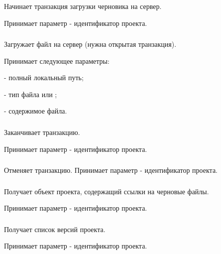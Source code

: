 Начинает транзакция загрузки черновика на сервер.

Принимает параметр  - идентификатор проекта.

\subsubsection{}

Загружает файл на сервер (нужна открытая транзакция). 

Принимает следующее параметры:

\begin{icItems}
	\item {} - полный локальный путь;
	\item {} - тип файла  или ;
	\item {} - содержимое файла.
\end{icItems}

\subsubsection{}

Заканчивает транзакцию.

Принимает параметр  - идентификатор проекта.

\subsubsection{}

Отменяет транзакцию. Принимает параметр  - идентификатор проекта.

\subsubsection{}

Получает объект проекта, содержащий ссылки на черновые файлы. 

Принимает параметр  - идентификатор проекта.

\subsubsection{}

Получает список версий проекта.

Принимает параметр  - идентификатор проекта.

